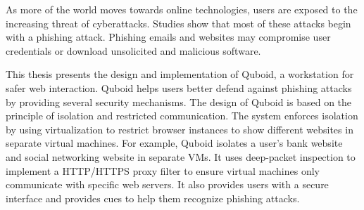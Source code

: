 % 
% 
%

As more of the world moves towards online technologies, users are exposed to the increasing threat of cyberattacks. Studies show that most of these attacks begin with a phishing attack. Phishing emails and websites may compromise user credentials or download unsolicited and malicious software.

This thesis presents the design and implementation of Quboid, a workstation for safer web interaction. Quboid helps users better defend against phishing attacks by providing several security mechanisms. The design of Quboid is based on the principle of isolation and restricted communication. The system enforces isolation by using virtualization to restrict browser instances to show different websites in separate virtual machines. For example, Quboid isolates a user's bank website and social networking website in separate VMs. It uses deep-packet inspection to implement a HTTP/HTTPS proxy filter to ensure virtual machines only communicate with specific web servers. It also provides users with a secure interface and provides cues to help them recognize phishing attacks.